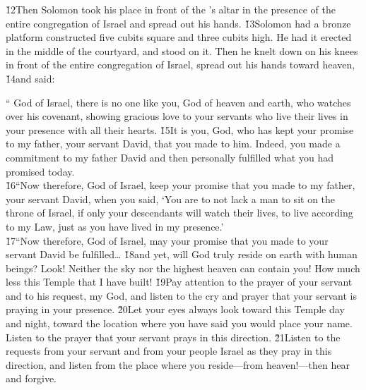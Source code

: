 \v{12}Then Solomon took his place in front of the 's altar in the presence of the entire congregation of Israel and spread out his hands. \v{13}Solomon had a bronze platform constructed five cubits square and three cubits high. He had it erected in the middle of the courtyard, and stood on it. Then he knelt down on his knees in front of the entire congregation of Israel, spread out his hands toward heaven, \v{14}and said:

\begin{poetry}
\poeml `` God of Israel, there is no one like you, God of heaven and earth, who watches over his covenant, showing gracious love to your servants who live their lives in your presence with all their hearts. \v{15}It is you,  God, who has kept your promise to my father, your servant David, that you made to him. Indeed, you made a commitment to my father David and then personally fulfilled what you had promised today. \\
\poeml \v{16}``Now therefore,  God of Israel, keep your promise that you made to my father, your servant David, when you said, `You are to not lack a man to sit on the throne of Israel, if only your descendants will watch their lives, to live according to my Law, just as you have lived in my presence.' \\
\poeml \v{17}``Now therefore,  God of Israel, may your promise that you made to your servant David be fulfilled{\ldots} \v{18}and yet, will God truly reside on earth with human beings? Look! Neither the sky nor the highest heaven can contain you! How much less this Temple that I have built! \v{19}Pay attention to the prayer of your servant and to his request,  my God, and listen to the cry and prayer that your servant is praying in your presence. \v{20}Let your eyes always look toward this Temple day and night, toward the location where you have said you would place your name. Listen to the prayer that your servant prays in this direction. \v{21}Listen to the requests from your servant and from your people Israel as they pray in this direction, and listen from the place where you reside---from heaven!---then hear and forgive. \\

\end{poetry}
